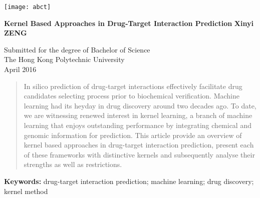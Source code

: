 \documentclass[a4paper,12pt]{report}
\begin{document}




\thispagestyle{empty}
\begin{flushright}
\texttt{[image: abct]}
\end{flushright}	
\vskip40mm
\begin{center}
\huge\textbf{Kernel Based Approaches in Drug-Target Interaction Prediction}
\vskip2mm
\LARGE\textit{ }
\vskip5mm
\Large\textbf{Xinyi ZENG}
\normalsize
\end{center}
\vfill
\begin{flushleft}
\large
Submitted for the degree of Bachelor of Science \\
The Hong Kong Polytechnic University	\\
April 2016
\end{flushleft}		


\newpage
{}
\tableofcontents
\listoftables
{}
{}


\newpage
{}

\begin{abstract}
In silico prediction of drug-target interactions effectively facilitate drug candidates selecting process prior to biochemical verification. Machine learning had its heyday in drug discovery around two decades ago. To date, we are witnessing renewed interest in kernel learning, a branch of machine learning that enjoys outstanding performance by integrating chemical and genomic information for prediction. This article provide an overview of kernel based approaches in drug-target interaction prediction, present each of these frameworks with distinctive kernels and subsequently analyse their strengths as well as restrictions.
\end{abstract}
\smallskip
\textbf{Keywords:} drug-target interaction prediction; machine learning; drug discovery; kernel method
\end{document}
